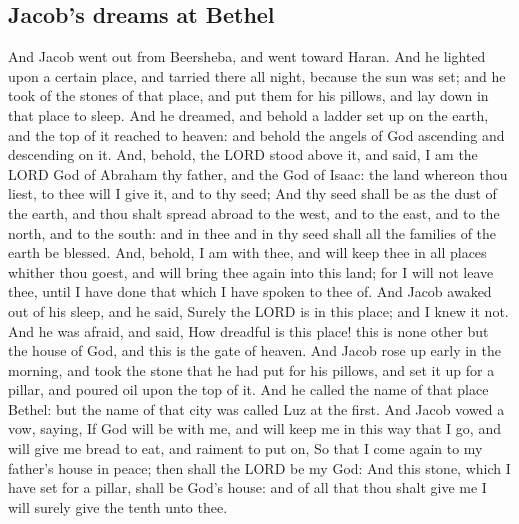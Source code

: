 \begin{biblechapter}
\section*{Jacob's dreams at Bethel}
\verse And Jacob went out from Beersheba, and went toward Haran.
\verse And he lighted upon a certain place, and tarried there all night, because the sun was set; and he took of the stones of that place, and put them for his pillows, and lay down in that place to sleep.
\verse And he dreamed, and behold a ladder set up on the earth, and the top of it reached to heaven: and behold the angels of God ascending and descending on it.
\verse And, behold, the LORD stood above it, and said, I am the LORD God of Abraham thy father, and the God of Isaac: the land whereon thou liest, to thee will I give it, and to thy seed;
\verse And thy seed shall be as the dust of the earth, and thou shalt spread abroad to the west, and to the east, and to the north, and to the south: and in thee and in thy seed shall all the families of the earth be blessed.
\verse And, behold, I am with thee, and will keep thee in all places whither thou goest, and will bring thee again into this land; for I will not leave thee, until I have done that which I have spoken to thee of.
\verse And Jacob awaked out of his sleep, and he said, Surely the LORD is in this place; and I knew it not.
\verse And he was afraid, and said, How dreadful is this place! this is none other but the house of God, and this is the gate of heaven.
\verse And Jacob rose up early in the morning, and took the stone that he had put for his pillows, and set it up for a pillar, and poured oil upon the top of it.
\verse And he called the name of that place Bethel: but the name of that city was called Luz at the first.
\verse And Jacob vowed a vow, saying, If God will be with me, and will keep me in this way that I go, and will give me bread to eat, and raiment to put on,
\verse So that I come again to my father's house in peace; then shall the LORD be my God:
\verse And this stone, which I have set for a pillar, shall be God's house: and of all that thou shalt give me I will surely give the tenth unto thee.
\end{biblechapter}


